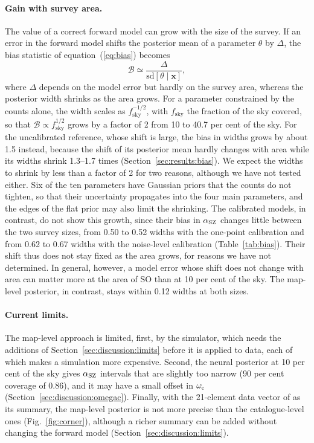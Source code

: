 \paragraph*{Gain with survey area.} The value of a correct forward model can grow with the size of the
survey. If an error in the forward model shifts the posterior mean of a parameter $\theta$ by $\Delta$, the
bias statistic of equation~(\ref{eq:bias}) becomes
\begin{equation}
\mathcal{B} \simeq \frac{\Delta}{\mathrm{sd}[\theta\mid\bm x]},
\label{eq:disc_bias}
\end{equation}
where $\Delta$ depends on the model error but hardly on the survey area, whereas the posterior width
shrinks as the area grows. For a parameter constrained by the counts alone, the width scales as
$f_\mathrm{sky}^{-1/2}$, with $f_\mathrm{sky}$ the fraction of the sky covered, so that
$\mathcal{B}\propto f_\mathrm{sky}^{1/2}$ grows by a factor of 2 from 10 to 40.7 per cent of the sky. For
the uncalibrated reference, whose shift is large, the bias in widths grows by about 1.5 instead, because
the shift of its posterior mean hardly changes with area while its widths shrink 1.3--1.7 times
(Section~\ref{sec:results:bias}). We expect the widths to shrink by less than a factor of 2 for two reasons,
although we have not tested either. Six of the ten parameters have Gaussian priors that the counts do not
tighten, so that their uncertainty propagates into the four main parameters, and the edges of the flat
prior may also limit the shrinking. The calibrated models, in contrast, do not show this growth, since
their bias in $\alpha_\mathrm{SZ}$ changes little between the two survey sizes, from 0.50 to 0.52 widths with the
one-point calibration and from 0.62 to 0.67 widths with the noise-level calibration
(Table~\ref{tab:bias}). Their shift thus does not stay fixed as the area grows, for reasons we have not
determined. In general, however, a model error whose shift does not change with area can matter more at
the area of SO than at 10 per cent of the sky. The map-level posterior, in contrast, stays within 0.12 widths at both
sizes.

\paragraph*{Current limits.} The map-level approach is limited, first, by the simulator, which needs the
additions of Section~\ref{sec:discussion:limits} before it is applied to data, each of which makes a
simulation more expensive. Second, the neural posterior at 10 per cent of the sky gives $\alpha_\mathrm{SZ}$ intervals that are slightly
too narrow (90 per cent coverage of 0.86), and it may have a small offset in $\omega_\mathrm{c}$
(Section~\ref{sec:discussion:omegac}). Finally, with the 21-element data vector of \citet{Zubeldia2025} as
its summary, the map-level posterior is not more precise than the catalogue-level ones
(Fig.~\ref{fig:corner}), although a richer summary can be added without changing the forward model
(Section~\ref{sec:discussion:limits}).

